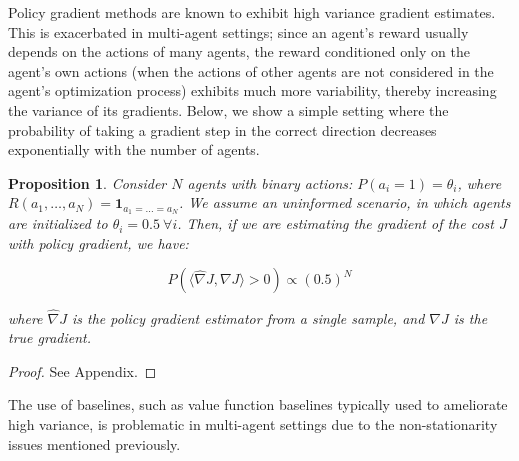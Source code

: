 \documentclass{article}
\newcommand{\dd}{\frac{\partial}{\partial \theta_i}}
\newtheorem{prop}{Proposition}
\begin{document}
Policy gradient methods are known to exhibit high variance gradient estimates.  This is exacerbated in multi-agent settings; since an agent's reward usually depends on the actions of many agents, the reward conditioned only on the agent's own actions (when the actions of other agents are not considered in the agent's optimization process) exhibits much more variability, thereby increasing the variance of its gradients.
Below, we show a simple setting where the probability of taking a gradient step in the correct direction decreases exponentially with the number of agents. 
\begin{prop}\label{prop:pg}
Consider $N$ agents with binary actions: $P(a_i=1) = \theta_i$, where $R(a_1,\dots,a_N) = \mathbf{1}_{a_1=\dots=a_N}$. We assume an uninformed scenario, in which agents are initialized to $\theta_i=0.5 \ \forall i$. Then, if we are estimating the gradient of the cost $J$ with policy gradient, we have:

$$ P(\langle \hat{\nabla} J, \nabla J \rangle > 0) \propto (0.5)^N
$$

where $\hat{\nabla} J$ is the policy gradient estimator from a single sample, and $\nabla J$ is the true gradient.
\end{prop}

\begin{proof}
See Appendix.
\end{proof}
The use of baselines, such as value function baselines typically used to ameliorate high variance, is problematic in multi-agent settings due to the non-stationarity issues mentioned previously.
\end{document}

